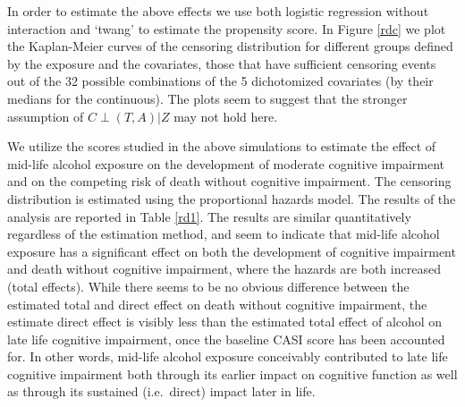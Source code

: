 \documentclass[11pt]{article}
\begin{document}
In order to estimate the above effects we use both  logistic regression without interaction and `twang' to estimate the propensity score. 
In Figure \ref{rdc} we plot the Kaplan-Meier curves of the censoring distribution for  different  groups defined by the exposure and the covariates, those that  have sufficient censoring events out of the 32 possible combinations of the 5 dichotomized  covariates (by their medians for the continuous).
 The plots seem to suggest that the stronger assumption of $C\perp (T,A) | Z$ may not hold here.
 
We  utilize the scores studied in the above simulations to estimate the effect of mid-life alcohol exposure on the development of moderate cognitive impairment and on the competing risk of death without cognitive impairment.
The censoring distribution is estimated using the proportional hazards model.
The results of the analysis are reported in Table \ref{rd1}. 
The results are similar quantitatively regardless of the estimation method, and seem to indicate that mid-life alcohol exposure has a significant effect on both the development of cognitive impairment and death without cognitive impairment, where the hazards are both increased (total effects). 
While there seems to be no obvious difference between the estimated total and direct effect  on death without cognitive impairment, the estimate direct effect is visibly less than the estimated total effect of alcohol on late life cognitive impairment, once the baseline CASI score has been accounted for. In other words, mid-life alcohol exposure conceivably contributed to late life cognitive impairment both through its earlier impact on cognitive function as well as through its sustained (i.e.~direct) impact later in life.
\end{document}

